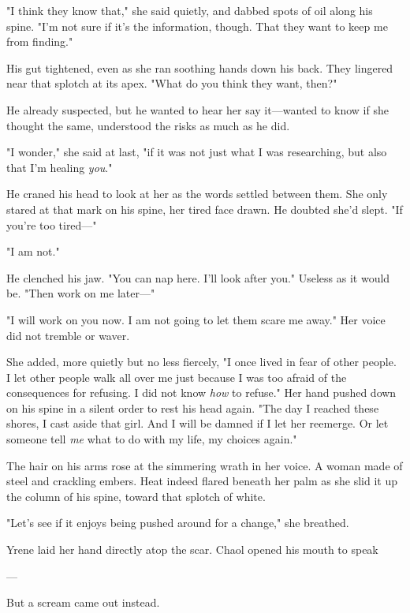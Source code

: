 "I think they know that," she said quietly, and dabbed spots of oil along his spine. "I'm not sure if it's the information, though. That they want to keep me from finding."

His gut tightened, even as she ran soothing hands down his back. They lingered near that splotch at its apex. "What do you think they want, then?"

He already suspected, but he wanted to hear her say it---wanted to know if she thought the same, understood the risks as much as he did.

"I wonder," she said at last, "if it was not just what I was researching, but also that I'm healing \emph{you}."

He craned his head to look at her as the words settled between them. She only stared at that mark on his spine, her tired face drawn. He doubted she'd slept. "If you're too tired---"

"I am not."

He clenched his jaw. "You can nap here. I'll look after you." Useless as it would be. "Then work on me later---"

"I will work on you now. I am not going to let them scare me away." Her voice did not tremble or waver.

She added, more quietly but no less fiercely, "I once lived in fear of other people. I let other people walk all over me just because I was too afraid of the consequences for refusing. I did not know \emph{how} to refuse." Her hand pushed down on his spine in a silent order to rest his head again. "The day I reached these shores, I cast aside that girl. And I will be damned if I let her reemerge. Or let someone tell
\emph{me} what to do with my life, my choices again."

The hair on his arms rose at the simmering wrath in her voice. A woman made of steel and crackling embers. Heat indeed flared beneath her palm as she slid it up the column of his spine, toward that splotch of white.

"Let's see if it enjoys being pushed around for a change," she breathed.

Yrene laid her hand directly atop the scar. Chaol opened his mouth to speak

---

But a scream came out instead.

